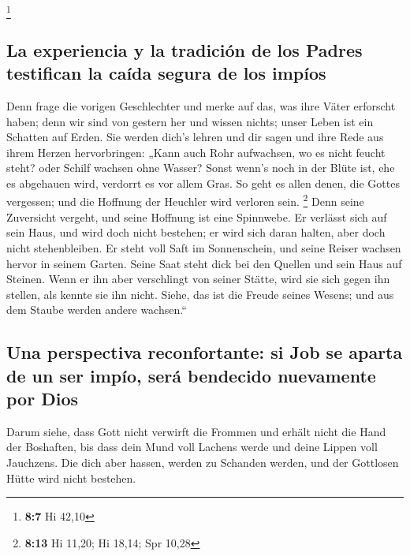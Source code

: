 \footnote{\textbf{8:7} Hi 42,10}

\hypertarget{la-experiencia-y-la-tradiciuxf3n-de-los-padres-testifican-la-cauxedda-segura-de-los-impuxedos}{%
\subsection{La experiencia y la tradición de los Padres testifican la
caída segura de los
impíos}\label{la-experiencia-y-la-tradiciuxf3n-de-los-padres-testifican-la-cauxedda-segura-de-los-impuxedos}}

 Denn frage die vorigen Geschlechter und merke auf das,
was ihre Väter erforscht haben;  denn wir sind von gestern
her und wissen nichts; unser Leben ist ein Schatten auf Erden.
 Sie werden dich's lehren und dir sagen und ihre Rede aus
ihrem Herzen hervorbringen:  „Kann auch Rohr aufwachsen,
wo es nicht feucht steht? oder Schilf wachsen ohne Wasser?
 Sonst wenn's noch in der Blüte ist, ehe es abgehauen
wird, verdorrt es vor allem Gras.  So geht es allen
denen, die Gottes vergessen; und die Hoffnung der Heuchler wird verloren
sein. \footnote{\textbf{8:13} Hi 11,20; Hi 18,14; Spr 10,28}
 Denn seine Zuversicht vergeht, und seine Hoffnung ist
eine Spinnwebe.  Er verlässt sich auf sein Haus, und wird
doch nicht bestehen; er wird sich daran halten, aber doch nicht
stehenbleiben.  Er steht voll Saft im Sonnenschein, und
seine Reiser wachsen hervor in seinem Garten.  Seine Saat
steht dick bei den Quellen und sein Haus auf Steinen. 
Wenn er ihn aber verschlingt von seiner Stätte, wird sie sich gegen ihn
stellen, als kennte sie ihn nicht.  Siehe, das ist die
Freude seines Wesens; und aus dem Staube werden andere wachsen.``

\hypertarget{una-perspectiva-reconfortante-si-job-se-aparta-de-un-ser-impuxedo-seruxe1-bendecido-nuevamente-por-dios}{%
\subsection{Una perspectiva reconfortante: si Job se aparta de un ser
impío, será bendecido nuevamente por
Dios}\label{una-perspectiva-reconfortante-si-job-se-aparta-de-un-ser-impuxedo-seruxe1-bendecido-nuevamente-por-dios}}

 Darum siehe, dass Gott nicht verwirft die Frommen und
erhält nicht die Hand der Boshaften,  bis dass dein Mund
voll Lachens werde und deine Lippen voll Jauchzens.  Die
dich aber hassen, werden zu Schanden werden, und der Gottlosen Hütte
wird nicht bestehen.

